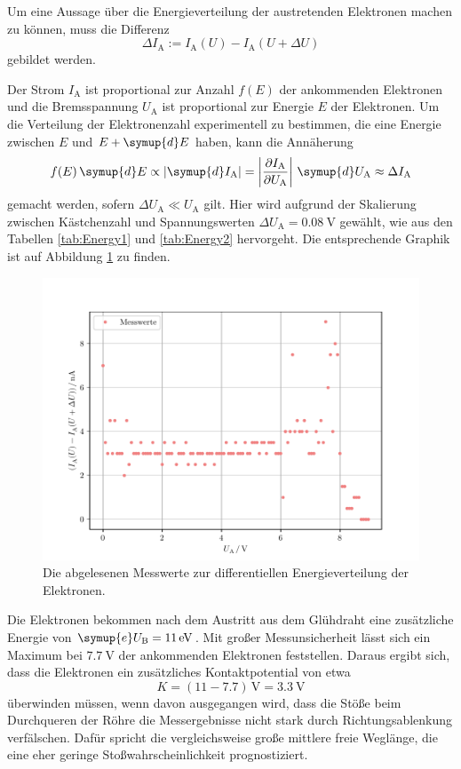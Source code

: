 Um eine Aussage über die Energieverteilung der austretenden Elektronen machen zu können, muss die Differenz 
\begin{equation*}
    \Delta I_\text{A} := I_\text{A} (U) - I_\text{A} (U+\Delta U)
\end{equation*}
gebildet werden.

Der Strom $I_\text{A}$ ist proportional zur Anzahl $f(E)$ der ankommenden Elektronen und die Bremsspannung $U_\text{A}$ ist proportional zur Energie $E$ der Elektronen. 
Um die Verteilung der Elektronenzahl experimentell zu bestimmen, die eine Energie zwischen $E$ und $E+\symup{d}E$ haben, kann die Annäherung 
\begin{equation*}
    f(E)\,\symup{d}E \propto |\symup{d} I_\text{A}| = \left\vert\frac{\partial I_\text{A}}{\partial U_\text{A}}\right\vert \, \symup{d}U_\text{A} \approx \Delta I_\text{A} 
\end{equation*}
gemacht werden, sofern $\Delta U_\text{A} \ll U_\text{A}$ gilt. 
Hier wird aufgrund der Skalierung zwischen Kästchenzahl und Spannungswerten $\Delta U_\text{A} = \SI{0.08}{\volt}$ gewählt, wie aus den 
Tabellen \ref{tab:Energy1} und \ref{tab:Energy2} hervorgeht. 
Die entsprechende Graphik ist auf Abbildung \ref{fig:EnergieDiffAb} zu finden. 
\begin{figure}
    \centering
    \includegraphics[width=\textwidth]{plots/EnergieDiff2.pdf}
    \caption{Die abgelesenen Messwerte zur differentiellen Energieverteilung der Elektronen.}
    \label{fig:EnergieDiffAb}
\end{figure}
Die Elektronen bekommen nach dem Austritt aus dem Glühdraht eine zusätzliche Energie von $\symup{e}U_\text{B}=\SI{11}{\electronvolt}$.
Mit großer Messunsicherheit lässt sich ein Maximum bei $\SI{7.7}{\volt}$ der ankommenden Elektronen feststellen. 
Daraus ergibt sich, dass die Elektronen ein zusätzliches Kontaktpotential von etwa
\begin{equation}
    K=(11-7.7)\,\si{\volt}=\SI{3.3}{\volt}
\end{equation}
überwinden müssen, wenn davon ausgegangen wird, dass die Stöße beim Durchqueren der Röhre die Messergebnisse nicht 
stark durch Richtungsablenkung verfälschen. 
Dafür spricht die vergleichsweise große mittlere freie Weglänge, die eine eher geringe Stoßwahrscheinlichkeit prognostiziert. 

